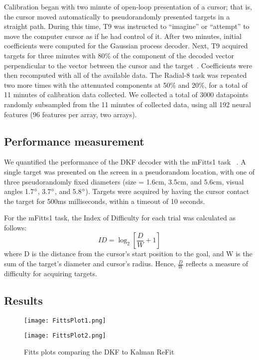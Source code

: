 Calibration began with two minute of open-loop presentation of a cursor; that is, the cursor moved automatically to pseudorandomly presented targets in a straight path. During this time, T9 was instructed to ``imagine'' or ``attempt'' to move the computer cursor as if he had control of it. After two minutes, initial coefficients were computed for the Gaussian process decoder.  Next, T9 acquired targets for three minutes with 80\% of the component of the decoded vector perpendicular to the vector between the cursor and the target~\cite{Jar13, Vel08}. Coefficients were then recomputed with all of the available data. The Radial-8 task was repeated two more times with the attenuated components at 50\% and 20\%, for a total of 11 minutes of calibration data collected. We collected a total of 3000 datapoints randomly subsampled from the 11 minutes of collected data, using all 192 neural features (96 features per array, two arrays).

\subsection{Performance measurement} 

We quantified the performance of the DKF decoder with the mFitts1 task ~\cite{Gil15, Sim11}. A single target was presented on the screen in a pseudorandom location, with one of three pseudorandomly fixed diameters (size = 1.6cm, 3.5cm, and 5.6cm, visual angles 1.7$\degree$, 3.7$\degree$, and 5.8$\degree$). Targets were acquired by having the cursor contact the target for 500ms milliseconds, within a timeout of 10 seconds. 

For the mFitts1 task, the Index of Difficulty for each trial was calculated as follows:
\begin{equation} 
\label{e:s2:Fitts} ID = \log_2\left[ \frac{D}{W} + 1 \right]
\end{equation}
where D is the distance from the cursor's start position to the goal, and W is the sum of the target's diameter and cursor's radius. Hence, $\frac{D}{W}$ reflects a measure of difficulty for acquiring targets. 

\subsection{Results}

\begin{figure}
\centering
\begin{minipage}{.49\linewidth}
  \centering
  \texttt{[image: FittsPlot1.png]}
\end{minipage}%
\begin{minipage}{.49\linewidth}
  \centering
  \texttt{[image: FittsPlot2.png]}
\end{minipage}%
\caption{Fitts plots comparing the DKF to Kalman ReFit}
\label{fig:fitts}
\end{figure}

